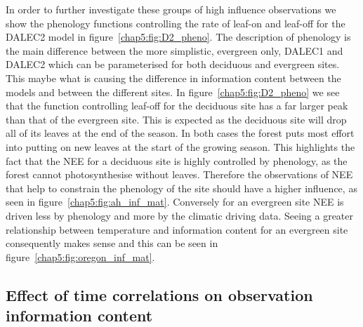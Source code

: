 In order to further investigate these groups of high influence observations we show the phenology functions controlling the rate of leaf-on and leaf-off for the DALEC2 model in figure~\ref{chap5:fig:D2_pheno}. The description of phenology is the main difference between the more simplistic, evergreen only, DALEC1 and DALEC2 which can be parameterised for both deciduous and evergreen sites. This maybe what is causing the difference in information content between the models and between the different sites. In figure~\ref{chap5:fig:D2_pheno} we see that the function controlling leaf-off for the deciduous site has a far larger peak than that of the evergreen site. This is expected as the deciduous site will drop all of its leaves at the end of the season. In both cases the forest puts most effort into putting on new leaves at the start of the growing season. This highlights the fact that the NEE for a deciduous site is highly controlled by phenology, as the forest cannot photosynthesise without leaves. Therefore the observations of NEE that help to constrain the phenology of the site should have a higher influence, as seen in figure~\ref{chap5:fig:ah_inf_mat}. Conversely for an evergreen site NEE is driven less by phenology and more by the climatic driving data. Seeing a greater relationship between temperature and information content  for an evergreen site consequently makes sense and this can be seen in figure~\ref{chap5:fig:oregon_inf_mat}.



\subsection{Effect of time correlations on observation information content}

